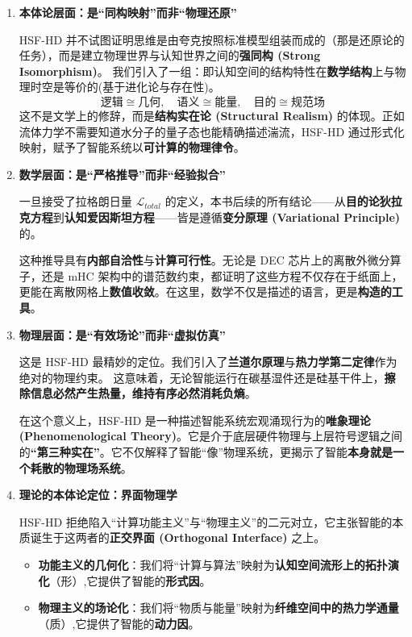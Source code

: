 \begin{enumerate}
    \item \textbf{本体论层面：是“同构映射”而非“物理还原”}

    HSF-HD 并不试图证明思维是由夸克按照标准模型组装而成的（那是还原论的任务），而是建立物理世界与认知世界之间的\textbf{强同构 (Strong Isomorphism)}。
    我们引入了一组：即认知空间的结构特性在\textbf{数学结构}上与物理时空是等价的(基于进化论与存在性)。
    $$ \text{逻辑} \cong \text{几何}, \quad \text{语义} \cong \text{能量}, \quad \text{目的} \cong \text{规范场} $$
    这不是文学上的修辞，而是\textbf{结构实在论 (Structural Realism)} 的体现。正如流体力学不需要知道水分子的量子态也能精确描述湍流，HSF-HD 通过形式化映射，赋予了智能系统以\textbf{可计算的物理律令}。

    \item \textbf{数学层面：是“严格推导”而非“经验拟合”}

    一旦接受了拉格朗日量 $\mathcal{L}_{total}$ 的定义，本书后续的所有结论——从\textbf{目的论狄拉克方程}到\textbf{认知爱因斯坦方程}——皆是遵循\textbf{变分原理 (Variational Principle)} 的。

    这种推导具有\textbf{内部自洽性}与\textbf{计算可行性}。无论是 DEC 芯片上的离散外微分算子，还是 mHC 架构中的谱范数约束，都证明了这些方程不仅存在于纸面上，更能在离散网格上\textbf{数值收敛}。在这里，数学不仅是描述的语言，更是\textbf{构造的工具}。

    \item \textbf{物理层面：是“有效场论”而非“虚拟仿真”}

    这是 HSF-HD 最精妙的定位。我们引入了\textbf{兰道尔原理}与\textbf{热力学第二定律}作为绝对的物理约束。
    这意味着，无论智能运行在碳基湿件还是硅基干件上，\textbf{擦除信息必然产生热量，维持有序必然消耗负熵}。

    在这个意义上，HSF-HD 是一种描述智能系统宏观涌现行为的\textbf{唯象理论 (Phenomenological Theory)}。它是介于底层硬件物理与上层符号逻辑之间的\textbf{“第三种实在”}。它不仅解释了智能“像”物理系统，更揭示了智能\textbf{本身就是一个耗散的物理场系统}。

    \item  \textbf{理论的本体论定位：界面物理学}

    HSF-HD 拒绝陷入“计算功能主义”与“物理主义”的二元对立，它主张智能的本质诞生于这两者的\textbf{正交界面 (Orthogonal Interface)} 之上。

    \begin{itemize}
        \item \textbf{功能主义的几何化}：我们将“计算与算法”映射为\textbf{认知空间流形上的拓扑演化}（形）,它提供了智能的\textbf{形式因}。
        \item \textbf{物理主义的场论化}：我们将“物质与能量”映射为\textbf{纤维空间中的热力学通量}（质）,它提供了智能的\textbf{动力因}。
    \end{itemize}


\end{enumerate}
